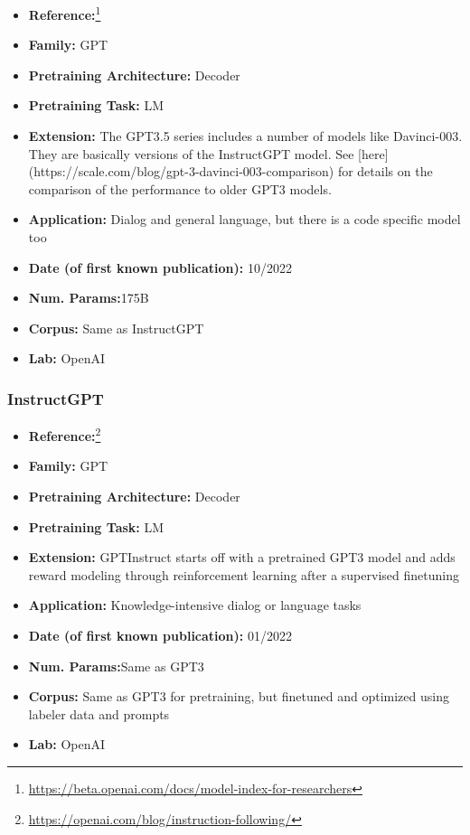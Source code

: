 \documentclass{article}
\begin{document}
            \begin{itemize}
                \item \textbf{Reference:}\footnote{\url{https://beta.openai.com/docs/model-index-for-researchers}}
                \item \textbf{Family:} GPT 
                \item \textbf{Pretraining Architecture:} Decoder
                \item \textbf{Pretraining Task:} LM
                \item \textbf{Extension:} The GPT3.5 series includes a number of models like Davinci-003. They are basically versions of the InstructGPT model. See [here](https://scale.com/blog/gpt-3-davinci-003-comparison) for details on the comparison of the performance to older GPT3 models.  
                \item \textbf{Application:} Dialog and general language, but there is a code specific model too
                \item \textbf{Date (of first known publication):} 10/2022
                \item \textbf{Num. Params:}175B
                \item \textbf{Corpus:} Same as InstructGPT
                \item \textbf{Lab:} OpenAI
            \end{itemize}
            
\subsubsection{InstructGPT}

            \begin{itemize}
                \item \textbf{Reference:}\footnote{\url{https://openai.com/blog/instruction-following/}}\cite{ouyang2022training}
                \item \textbf{Family:} GPT 
                \item \textbf{Pretraining Architecture:} Decoder
                \item \textbf{Pretraining Task:} LM
                \item \textbf{Extension:} GPTInstruct starts off with a pretrained GPT3 model and adds reward modeling through reinforcement learning after a supervised finetuning  
                \item \textbf{Application:} Knowledge-intensive dialog or language tasks
                \item \textbf{Date (of first known publication):} 01/2022
                \item \textbf{Num. Params:}Same as GPT3
                \item \textbf{Corpus:} Same as GPT3 for pretraining, but finetuned and optimized using labeler data and prompts
                \item \textbf{Lab:} OpenAI
            \end{itemize}
\end{document}
